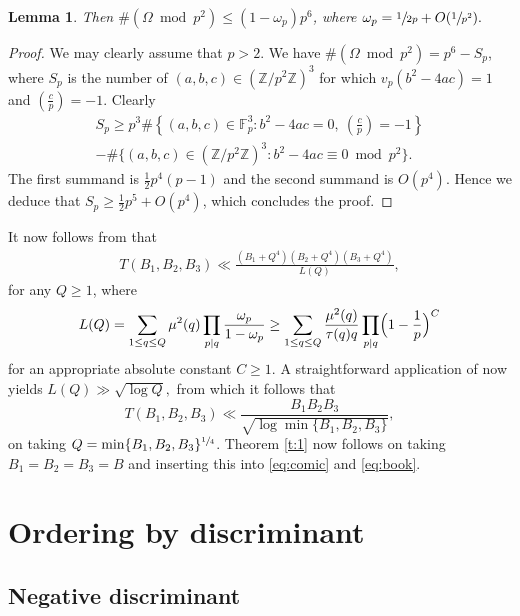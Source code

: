 \documentclass[11pt]{article}
\newcommand{\FF}{\mathbb{F}}
\newcommand{\ZZ}{\mathbb{Z}}\let\Z\ZZ
\newtheorem{lemma}[theorem]{Lemma}
\numberwithin{equation}{section}
\begin{document}
\begin{lemma}
Then $\#(\Omega \bmod{p^2})\leq (1-\omega_p)p^6$, where
$\omega_p=\sfrac{1}{2p}+O(\sfrac{1}{p^2}).$
\end{lemma}

\begin{proof}
We may clearly assume that $p>2$. We have $\#(\Omega \bmod{p^2})=p^6-S_p$, where
$S_p$ is the number of $(a,b,c)\in (\ZZ/p^2\ZZ)^3$ for which $v_p(b^2-4ac)=1$ and
$(\frac{c}{p})= -1$.
Clearly
\begin{multline*}
S_p\geq
p^3\#\left\{ (a,b,c)\in \FF_p^3: b^2-4ac=0, ~\left(\frac{c}{p}\right)= -1\right\}\\
-\#\bigl\{
(a,b,c)\in (\ZZ/p^2\ZZ)^3: b^2-4ac\equiv 0\bmod{p^2}\bigr\}.
\end{multline*}
The first summand is $\frac{1}{2}p^4(p-1)$
and the second summand is $O(p^4)$.
Hence we deduce that
$S_p\geq \frac{1}{2}p^5+O(p^4)$, which concludes the proof.
\end{proof}

It now follows from
\cite[Lem.\,6.3]{large} that
\begin{align*}
T(B_1,B_2,B_3)
\ll \frac{(B_1+Q^4)(B_2+Q^4)(B_3+Q^4)}{L(Q)},
\end{align*}
for any $Q\geq 1$,
where
\[
L(Q)=\sum_{1\leq q\leq Q}\mu^2(q)\prod_{p\mid q} \frac{\omega_p}{1-\omega_p}\geq
\sum_{1\leq q\leq Q}\frac{\mu^2(q)}{\tau(q)q}\prod_{p\mid q} \Bigl(1-\frac{1}{p}\Bigr)^C
\]
for an appropriate absolute constant $C\geq 1$.
A straightforward application of
\hbox{\cite[Th.\,A.5]{FrIwOdC}} now yields
$
L(Q)\gg \sqrt{\log Q},
$
from which it follows that
\begin{equation}\label{eq:Tve}
T(B_1,B_2,B_3)\ll \frac{B_1B_2B_3}{\sqrt{\log \min \{B_1,B_2,B_3\}}},
\end{equation}
on taking $Q=\min \{B_1,B_2,B_3\}^{\sfrac{1}{4}}$.
Theorem \ref{t:1} now follows on
taking $B_1=B_2=B_3=B$ and
inserting this into \eqref{eq:comic} and \eqref{eq:book}.

\section{Ordering by discriminant}

\subsection{Negative discriminant}\label{sec:disc1}
\end{document}
